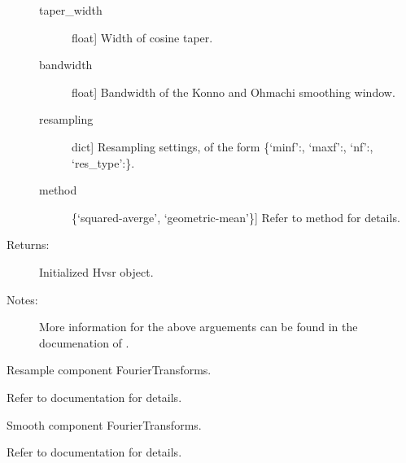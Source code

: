 \documentclass[letterpaper,10pt,english,openany,oneside]{sphinxmanual}
\begin{document}
\begin{fulllineitems}
\begin{fulllineitems}
\begin{description}
\begin{description}
\item[{taper\_width}] \leavevmode{[}float{]}
Width of cosine taper.

\item[{bandwidth}] \leavevmode{[}float{]}
Bandwidth of the Konno and Ohmachi smoothing window.

\item[{resampling}] \leavevmode{[}dict{]}
Resampling settings, of the form 
\{‘minf’:, ‘maxf’:, ‘nf’:, 
‘res\_type’:\}.

\item[{method}] \leavevmode{[}\{‘squared-averge’, ‘geometric-mean’\}{]}
Refer to method  for details.

\end{description}

\item[{Returns:}] \leavevmode
Initialized Hvsr object.

\item[{Notes:}] \leavevmode
More information for the above arguements can be found in
the documenation of .

\end{description}

\end{fulllineitems}


\begin{fulllineitems}
\label{\detokenize{index:hvsrpy.Sensor3c.resample}}
Resample component FourierTransforms.

Refer to  documentation for details.

\end{fulllineitems}


\begin{fulllineitems}
\label{\detokenize{index:hvsrpy.Sensor3c.smooth}}
Smooth component FourierTransforms.

Refer to  documentation for details.


\end{fulllineitems}
\end{fulllineitems}
\end{document}
